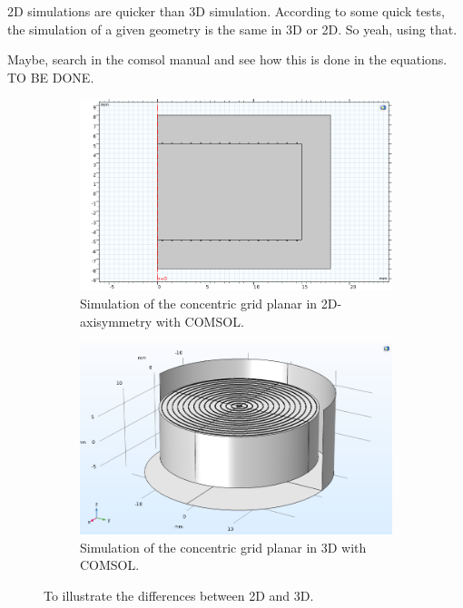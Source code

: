 2D simulations are quicker than 3D simulation.
According to some quick tests, the simulation of a given geometry is the same in 3D or 2D.
So yeah, using that.

Maybe, search in the comsol manual and see how this is done in the equations.
TO BE DONE.

\begin{figure}
\centering
\begin{subfigure}{.5\textwidth}
  \centering
  \includegraphics[width=\linewidth]{Figures/Electrodes/2D_simulation.png}
  \caption{Simulation of the concentric grid planar in 2D-axisymmetry with COMSOL.}
  \label{fig:2D-simulation}
\end{subfigure}%
\begin{subfigure}{0.5\textwidth}
  \centering
  \includegraphics[width=\linewidth]{Figures/Electrodes/3D_simulation.png}
  \caption{Simulation of the concentric grid planar in 3D with COMSOL.}
  \label{fig:3D-simulation}
\end{subfigure}
\caption{To illustrate the differences between 2D and 3D.}
\label{fig:2D-vs-3D}
\end{figure}

